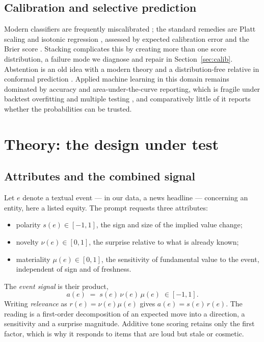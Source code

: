 \documentclass[preprint,12pt,authoryear]{elsarticle}
\theoremstyle{plain}
\theoremstyle{remark}
\begin{document}
\subsection{Calibration and selective prediction}

Modern classifiers are frequently miscalibrated \citep{guo2017}; the standard
remedies are Platt scaling \citep{platt1999} and isotonic regression
\citep{zadrozny2002}, assessed by expected calibration error and the Brier score
\citep{brier1950}. Stacking \citep{wolpert1992} complicates this by creating
more than one score distribution, a failure mode we diagnose and repair in
Section~\ref{sec:calib}. Abstention is an old idea \citep{chow1970} with a
modern theory \citep{geifman2017,elyaniv2010} and a distribution-free relative in
conformal prediction \citep{angelopoulos2023}. Applied machine learning in this
domain remains dominated by accuracy and area-under-the-curve reporting, which
is fragile under backtest overfitting \citep{bailey2017} and multiple testing
\citep{harvey2016,romano2005}, and comparatively little of it reports whether the
probabilities can be trusted.

\section{Theory: the design under test}\label{sec:theory}

\subsection{Attributes and the combined signal}

Let $e$ denote a textual event --- in our data, a news headline --- concerning an
entity, here a listed equity. The prompt requests three attributes:

\begin{itemize}
\item polarity $s(e)\in[-1,1]$, the sign and size of the implied value change;
\item novelty $\nu(e)\in[0,1]$, the surprise relative to what is already known;
\item materiality $\mu(e)\in[0,1]$, the sensitivity of fundamental value to the
  event, independent of sign and of freshness.
\end{itemize}

The \emph{event signal} is their product,
\begin{equation}\label{eq:signal}
a(e)\;=\;s(e)\,\nu(e)\,\mu(e)\;\in[-1,1].
\end{equation}
Writing \emph{relevance} as $r(e)=\nu(e)\mu(e)$ gives $a(e)=s(e)\,r(e)$. The
reading is a first-order decomposition of an expected move into a direction, a
sensitivity and a surprise magnitude. Additive tone scoring retains only the
first factor, which is why it responds to items that are loud but stale or
cosmetic.
\end{document}
